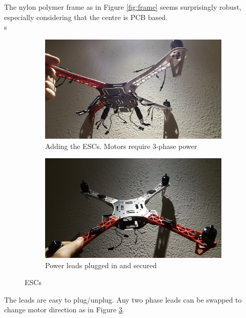 The nylon polymer frame as in Figure \ref{fig:frame} seems surprisingly robust, especially considering that the centre is PCB based.\\
s
\begin{figure}[H]
\begin{subfigure}{0.5\textwidth}
\centering
\includegraphics[scale=0.1]{images/drone-build-esc-3phaseunconnected.jpg}
\caption{Adding the ESCs. Motors require 3-phase power}
\label{fig:ESCs_uplugged}
\end{subfigure}
\begin{subfigure}{0.5\textwidth}
\centering
\includegraphics[scale=0.1]{images/drone-build-esc-3phaseconnected.jpg}
\caption{Power leads plugged in and secured}
\label{fig:ESCs_plugged}
\end{subfigure}
\caption{ESCs}
\label{fig:ESC}
\end{figure}

The leads are easy to plug/unplug. Any two phase leads can be swapped to change motor direction as in Figure \ref{fig:ESC}.\\

